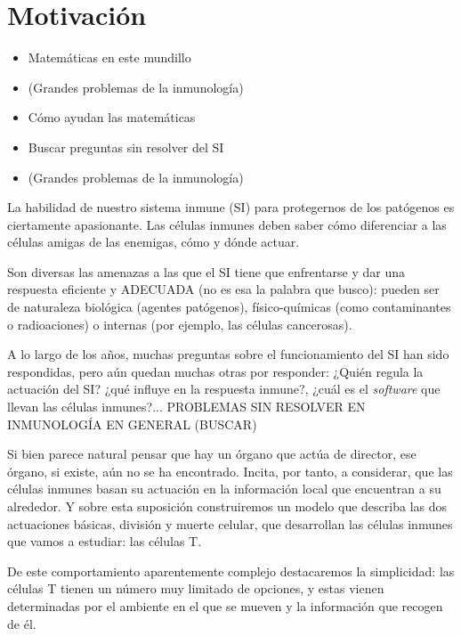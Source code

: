 \section{Motivación}

\begin{itemize}
	\item Matemáticas en este mundillo
	\item (Grandes problemas de la inmunología)
	\item Cómo ayudan las matemáticas
\end{itemize}

\begin{itemize}
	\item Buscar preguntas sin resolver del SI
	\item (Grandes problemas de la inmunología)
\end{itemize}
La habilidad de nuestro sistema inmune (SI) para protegernos de los patógenos es ciertamente apasionante. Las células inmunes deben saber cómo diferenciar a las células amigas de las enemigas, cómo y dónde actuar.

Son diversas las amenazas a las que el SI tiene que enfrentarse y dar una respuesta eficiente y ADECUADA (no es esa la palabra que busco): pueden ser de naturaleza biológica (agentes patógenos), físico-químicas (como contaminantes o radioaciones) o internas (por ejemplo, las células cancerosas).

A lo largo de los años, muchas preguntas sobre el funcionamiento del SI han sido respondidas, pero aún quedan muchas otras por responder: ¿Quién regula la actuación del SI? ¿qué influye en la respuesta inmune?, ¿cuál es el \textit{software} que llevan las células inmunes?... PROBLEMAS SIN RESOLVER EN INMUNOLOGÍA EN GENERAL (BUSCAR)

Si bien parece natural pensar que hay un órgano que actúa de director, ese
órgano, si existe, aún no se ha encontrado. Incita, por tanto, a considerar, que las
células inmunes basan su actuación en la información local que encuentran a su
alrededor. Y sobre esta suposición construiremos un modelo que describa las
dos actuaciones básicas, división y muerte celular, que desarrollan las células inmunes que vamos a estudiar: las células T.

De este comportamiento aparentemente complejo destacaremos la simplicidad: las células T tienen un número muy limitado de opciones, y estas vienen determinadas por el ambiente en el que se mueven y la información que recogen de él.


